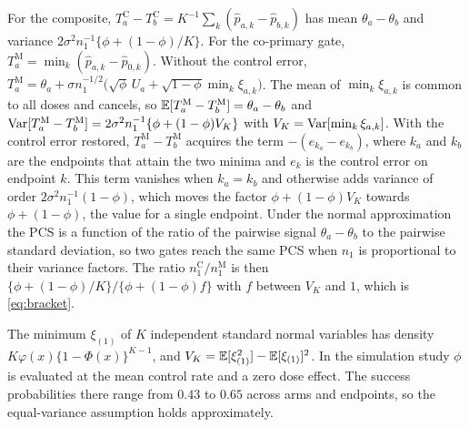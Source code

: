 \begin{appendix}
For the composite, $T^{\mathrm C}_a-T^{\mathrm C}_b=K^{-1}\sum_k(\hat p_{a,k}-\hat p_{b,k})$ has mean $\theta_a-\theta_b$ and variance $2\sigma^2n_1^{-1}\{\phi+(1-\phi)/K\}$. For the co-primary gate, $T^{\mathrm M}_a=\min_k(\hat p_{a,k}-\hat p_{0,k})$. Without the control error, $T^{\mathrm M}_a=\theta_a+\sigma n_1^{-1/2}\big(\sqrt\phi\,U_a+\sqrt{1-\phi}\min_k\xi_{a,k}\big)$. The mean of $\min_k\xi_{a,k}$ is common to all doses and cancels, so $\mathbb{E}[T^{\mathrm M}_a-T^{\mathrm M}_b]=\theta_a-\theta_b$ and $\mathrm{Var}[T^{\mathrm M}_a-T^{\mathrm M}_b]=2\sigma^2n_1^{-1}\{\phi+(1-\phi)V_K\}$ with $V_K=\mathrm{Var}[\min_k\xi_{a,k}]$. With the control error restored, $T^{\mathrm M}_a-T^{\mathrm M}_b$ acquires the term $-(e_{k_a}-e_{k_b})$, where $k_a$ and $k_b$ are the endpoints that attain the two minima and $e_k$ is the control error on endpoint $k$. This term vanishes when $k_a=k_b$ and otherwise adds variance of order $2\sigma^2n_1^{-1}(1-\phi)$, which moves the factor $\phi+(1-\phi)V_K$ towards $\phi+(1-\phi)$, the value for a single endpoint. Under the normal approximation the PCS is a function of the ratio of the pairwise signal $\theta_a-\theta_b$ to the pairwise standard deviation, so two gates reach the same PCS when $n_1$ is proportional to their variance factors. The ratio $n_1^{\mathrm C}/n_1^{\mathrm M}$ is then $\{\phi+(1-\phi)/K\}/\{\phi+(1-\phi)f\}$ with $f$ between $V_K$ and $1$, which is \eqref{eq:bracket}.

The minimum $\xi_{(1)}$ of $K$ independent standard normal variables has density $K\varphi(x)\{1-\Phi(x)\}^{K-1}$, and $V_K=\mathbb{E}[\xi_{(1)}^2]-\mathbb{E}[\xi_{(1)}]^2$. In the simulation study $\phi$ is evaluated at the mean control rate and a zero dose effect. The success probabilities there range from $0.43$ to $0.65$ across arms and endpoints, so the equal-variance assumption holds approximately.

\end{appendix}

